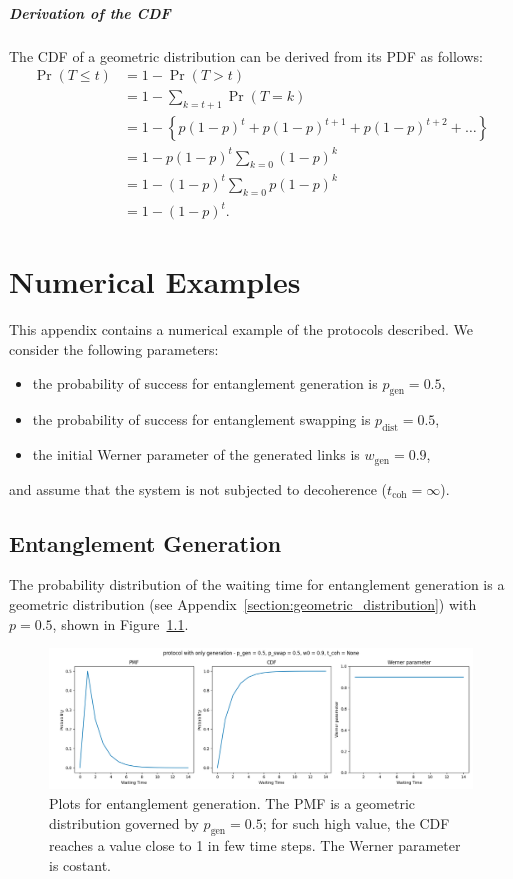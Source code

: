 \documentclass{masterthesis}
\begin{document}
\paragraph*{Derivation of the CDF}
The CDF of a geometric distribution can be derived from its PDF as follows:
\begin{align*}
    \Pr(T \leq t) &= 1 - \Pr(T > t) \\
    &= 1 - \sum_{k=t+1} \Pr(T = k) \\
    &= 1 - \left\{p (1 - p)^t + p (1 - p)^{t+1} + p (1 - p)^{t+2} + \ldots\right\} \\
    &= 1 - p (1 - p)^t \sum_{k=0} (1 - p)^k \\
    &= 1 - (1 - p)^t \sum_{k=0} p (1 - p)^k \\
    &= 1 - (1 - p)^t.
\end{align*} %

\chapter{Numerical Examples}
This appendix contains a numerical example of the protocols described. We consider the following parameters:
\begin{itemize}
    \item the probability of success for entanglement generation is $p_{\text{gen}} = 0.5$,
    \item the probability of success for entanglement swapping is $p_{\text{dist}} = 0.5$,
    \item the initial Werner parameter of the generated links is $w_{\text{gen}} = 0.9$,
\end{itemize}
and assume that the system is not subjected to decoherence ($t_\text{coh} = \infty$).

\section{Entanglement Generation}

The probability distribution of the waiting time for entanglement generation is a geometric distribution (see Appendix~\ref{section:geometric_distribution}) with $p = 0.5$, shown in Figure~\ref{fig:gen_waiting_time}.
\begin{figure}[ht]
    \centering
    \includegraphics[width=1\linewidth]{images/dist_tests/only generation.png}
    \caption{Plots for entanglement generation. The PMF is a geometric distribution governed by $p_\text{gen} = 0.5$; for such high value, the CDF reaches a value close to 1 in few time steps. The Werner parameter is costant.}
    \label{fig:gen_waiting_time}
\end{figure}
\end{document}
